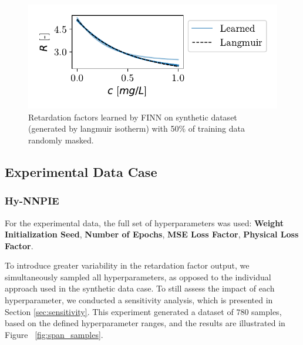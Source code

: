 \begin{figure}[h]
    \centering
    \includegraphics{figs/finn_synthetic_SPAN_losspattern.pdf}
    \caption{Retardation factors learned by FINN on synthetic dataset (generated by langmuir isotherm) with 50\% of training data randomly masked.}
    \label{fig:synthetic_SPAN_losspattern}
\end{figure}






\subsection{Experimental Data Case}

\subsubsection{Hy-NNPIE}
For the experimental data, the full set of hyperparameters was used: \textbf{Weight Initialization Seed}, \textbf{Number of Epochs}, \textbf{MSE Loss Factor}, \textbf{Physical Loss Factor}.

To introduce greater variability in the retardation factor output, we simultaneously sampled all hyperparameters, as opposed to the individual approach used in the synthetic data case. To still assess the impact of each hyperparameter, we conducted a sensitivity analysis, which is presented in Section \vref{sec:sensitivity}. This experiment generated a dataset of $780$ samples, based on the defined hyperparameter ranges, and the results are illustrated in Figure ~\vref{fig:span_samples}.

